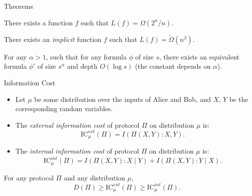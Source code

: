 \documentclass[aspectratio=169]{beamer}
\newcommand{\pitem}{\pause\item}
\newcommand{\IC}{\mathrm{IC}}
\begin{document}
\begin{frame}{Theorems}
   \begin{theorem}[Shannon]
       There exists a function $f$ such that $L(f) = \Omega(2^n/n)$.
   \end{theorem}

   \pause
   \begin{theorem}[Håstad]
        There exists an \emph{implicit} function $f$ such that $L(f) = \tilde\Omega(n^3)$.
   \end{theorem}

   \pause
   \begin{theorem}
        For any $\alpha > 1$, such that for any formula $\phi$ of size $s$, there exists an equivalent formula $\phi'$ of size $s^\alpha$ and depth $O(\log s)$ (the constant depends on $\alpha$).
   \end{theorem}
\end{frame}

\begin{frame}{Information Cost}

    \begin{itemize}
        \item
            Let $\mu$ be some distribution over the inputs of Alice and Bob,
            and $X$, $Y$ be the corresponding random variables.

        \pitem The \emph{external information cost} of protocol $\Pi$ on distribution $\mu$ is:
            $$\IC_\mu^{ext}(\Pi) = I(\Pi(X,Y) : X, Y).$$


        \pitem The \emph{internal information cost} of protocol $\Pi$ on distribution $\mu$ is:
            $$\IC_\mu^{int}(\Pi) = I(\Pi(X,Y) : X \mid Y) + I(\Pi(X,Y) : Y \mid X).$$
    \end{itemize}

    \pause
    \begin{lemma}
        For any protocol $\Pi$ and any distribution $\mu$,
        \[
        D(\Pi) \ge \IC_\mu^{ext}(\Pi) \ge \IC_\mu^{int}(\Pi).
        \]
    \end{lemma}

\end{frame}
\end{document}
